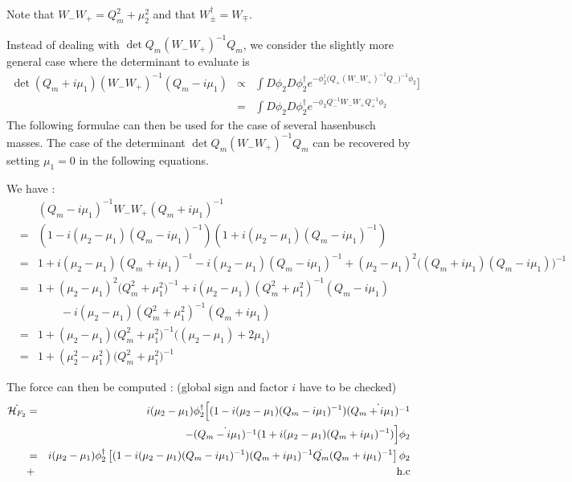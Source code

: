 \documentclass{article}[12pt]
\begin{document}
Note that $W_- W_+ = Q_m ^2 + \mu_2^2$  and that $W_\pm^{\dagger}=
W_{\mp}$.

Instead of dealing with $\det{ Q_m (W_-
 W_+)^{-1} Q_m }$, we consider the slightly more general
case where the determinant to evaluate is
\begin{eqnarray}
\det{ (Q_m + i \mu_1) (W_-
 W_+)^{-1}  (Q_m - i \mu_1)}&\propto&\int D\phi_2 D\phi_2^\dagger e^{-\phi^\dagger_2 \Big(Q_+ (W_-
 W_+)^{-1}  Q_- \Big)^{-1}\phi_2 }\big] \\
&=& \int D\phi_2 D\phi_2^\dagger e^{-\phi_2Q_-^{-1} W_- W_+
  Q_+^{-1}  \phi_2 }
\end{eqnarray}
  The following formulae can then be
used for the case of several hasenbusch masses.
The case of the determinant $\det{ Q_m (W_-
 W_+)^{-1} Q_m }$  can be
recovered by setting $\mu_1=0$ in the following equations.

We have :
\begin{eqnarray}
&& (Q_m-i\mu_1)^{-1} W_- W_+ (Q_m+i\mu_1)^{-1} \\
 &=& ( 1 - i(\mu_2 - \mu_1)
(Q_m - i \mu_1)^{-1}) (1+ i(\mu_2 - \mu_1)(Q_m - i \mu_1)^{-1}) \\
&=& 1+ i(\mu_2 - \mu_1) (Q_m+i\mu_1)^{-1}  - i(\mu_2 - \mu_1)
(Q_m - i \mu_1)^{-1} + (\mu_2- \mu_1)^2\big((Q_m + i \mu_1)(Q_m - i
\mu_1)\big)^{-1} \\
&=& 1+ (\mu_2- \mu_1)^2\big(Q_m^2 + \mu_1^2\big)^{-1}+ i(\mu_2 -
\mu_1) (Q_m^2 +\mu_1^2)^{-1}  (Q_m-i\mu_1) \\
&&\qquad -i(\mu_2 - \mu_1)
(Q_m^2 +  \mu_1^2)^{-1} (Q_m+i\mu_1) \\
&=& 1 +(\mu_2- \mu_1) \big(Q_m^2 + \mu_1^2\big)^{-1} \big( (\mu_2- \mu_1)
+ 2 \mu_1 \big) \\
&=& 1 +(\mu_2^2- \mu_1^2) \big(Q_m^2 + \mu_1^2\big)^{-1}
\end{eqnarray}

The force can then be computed : (global sign and factor $i$ have to be checked)
\begin{eqnarray}
 \dot{\mathcal{H}_{F_2}}  &=&   i(\mu_2-\mu_1) \phi_2^{\dagger} \Big[ ( 1 - i(\mu_2 - \mu_1)
  (Q_m - i \mu_1)^{-1}) \dot{(Q_m+i\mu_1)^{-1}}  \\
 &&- \dot{(Q_m - i    \mu_1)^{-1}} (1+ i (\mu_2 - \mu_1) (Q_m+i \mu_1)^{-1})\Big] \phi_2 \\
&=&  i(\mu_2-\mu_1) \phi_2^{\dagger} \left[  ( 1 - i(\mu_2 - \mu_1)
  (Q_m - i\mu_1)^{-1}) ( Q_m+i\mu_1)^{-1} \dot{Q_m} (Q_m+i\mu_1)^{-1}
\right] \phi_2 \\  &+& \rm{h.c}
\end{eqnarray}
\end{document}
